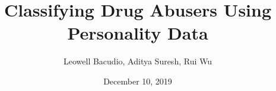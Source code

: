 \documentclass[10pt,twocolumn]{article}
\begin{document}
\title{\textbf{Classifying Drug Abusers Using Personality Data}}

\author{Leowell Bacudio, Aditya Suresh, Rui Wu}

%
\date{December 10, 2019}
\maketitle


 
 
 

\newpage


\end{document}
